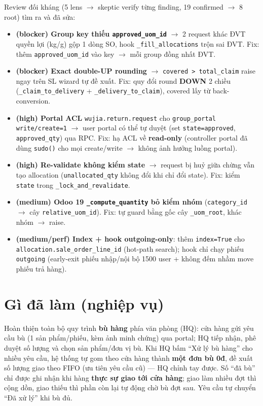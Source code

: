 Review đối kháng (5 lens $\to$ skeptic verify từng finding, 19 confirmed $\to$ 8 root) tìm ra và đã sửa:
\begin{itemize}
  \item \textbf{(blocker) Group key thiếu \texttt{approved\_uom\_id}} $\to$ 2 request khác ĐVT quyền lợi
    (kg/g) gộp 1 dòng SO, hook \texttt{\_fill\_allocations} trộn sai ĐVT. Fix: thêm
    \texttt{approved\_uom\_id} vào key $\to$ mỗi group đồng nhất ĐVT.
  \item \textbf{(blocker) Exact double-UP rounding} $\to$ \texttt{covered > total\_claim} raise ngay trên
    SL wizard tự đề xuất. Fix: quy đổi round \textbf{DOWN} 2 chiều (\texttt{\_claim\_to\_delivery} +
    \texttt{\_delivery\_to\_claim}), covered lấy từ back-conversion.
  \item \textbf{(high) Portal ACL} \texttt{wujia.return.request} cho \texttt{group\_portal}
    \texttt{write/create=1} $\to$ user portal có thể tự duyệt (set \texttt{state=approved},
    \texttt{approved\_qty}) qua RPC. Fix: hạ ACL về \textbf{read-only} (controller portal đã dùng
    \texttt{sudo()} cho mọi create/write $\to$ không ảnh hưởng luồng portal).
  \item \textbf{(high) Re-validate không kiểm state} $\to$ request bị huỷ giữa chừng vẫn tạo allocation
    (\texttt{unallocated\_qty} không đổi khi chỉ đổi state). Fix: kiểm \texttt{state} trong
    \texttt{\_lock\_and\_revalidate}.
  \item \textbf{(medium) Odoo 19 \texttt{\_compute\_quantity} bỏ kiểm nhóm} (\texttt{category\_id} $\to$ cây
    \texttt{relative\_uom\_id}). Fix: tự guard bằng gốc cây \texttt{\_uom\_root}, khác nhóm $\to$ raise.
  \item \textbf{(medium/perf) Index + hook outgoing-only}: thêm \texttt{index=True} cho
    \texttt{allocation.sale\_order\_line\_id} (hot-path search); hook chỉ chạy phiếu \texttt{outgoing}
    (early-exit phiếu nhập/nội bộ 1500 user + không đếm nhầm move phiếu trả hàng).
\end{itemize}

\section{Gì đã làm (nghiệp vụ)}

Hoàn thiện toàn bộ quy trình \textbf{bù hàng} phía văn phòng (HQ): cửa hàng gửi yêu cầu bù (1 sản phẩm/phiếu,
kèm ảnh minh chứng) qua portal; HQ tiếp nhận, phê duyệt số lượng và chọn sản phẩm/đơn vị bù. Khi HQ bấm
``Xử lý bù hàng'' cho nhiều yêu cầu, hệ thống tự gom theo cửa hàng thành \textbf{một đơn bù 0đ}, đề xuất số
lượng giao theo FIFO (ưu tiên yêu cầu cũ) --- HQ chỉnh tay được. Số ``đã bù'' chỉ được ghi nhận khi hàng
\textbf{thực sự giao tới cửa hàng}; giao làm nhiều đợt thì cộng dồn, giao thiếu thì phần còn lại tự động
chờ bù đợt sau. Yêu cầu tự chuyển ``Đã xử lý'' khi bù đủ.


